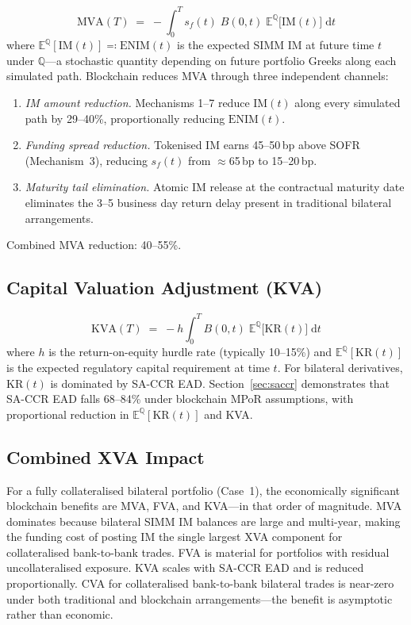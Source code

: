 \documentclass[12pt,letterpaper]{article}
\numberwithin{equation}{section}
\theoremstyle{remark}
\newcommand{\EQ}{\mathbb{E}^{\mathbb{Q}}}          %
\newcommand{\Q}{\mathbb{Q}}                         %
\newcommand{\df}{B(0,t)}
\begin{document}
\begin{equation}
  \mathrm{MVA}(T) \;=\;
  -\int_0^T s_f(t)\;\df\;\EQ\!\bigl[\mathrm{IM}(t)\bigr]\;\mathrm{d}t
  \label{eq:mva}
\end{equation}
where $\EQ[\mathrm{IM}(t)] \eqqcolon \mathrm{ENIM}(t)$ is the expected SIMM
IM at future time $t$ under $\Q$---a stochastic quantity depending on
future portfolio Greeks along each simulated path. Blockchain reduces MVA
through three independent channels:
\begin{enumerate}[leftmargin=2.5em,itemsep=3pt,topsep=4pt]
  \item \textit{IM amount reduction.} Mechanisms 1--7 reduce $\mathrm{IM}(t)$
    along every simulated path by 29--40\%, proportionally reducing
    $\mathrm{ENIM}(t)$.
  \item \textit{Funding spread reduction.} Tokenised IM earns 45--50\,bp
    above SOFR (Mechanism~3), reducing $s_f(t)$ from $\approx$65\,bp to
    15--20\,bp.
  \item \textit{Maturity tail elimination.} Atomic IM release at the
    contractual maturity date eliminates the 3--5 business day return
    delay present in traditional bilateral arrangements.
\end{enumerate}
Combined MVA reduction: 40--55\%.

\subsection{Capital Valuation Adjustment (KVA)}

\begin{equation}
  \mathrm{KVA}(T) \;=\;
  -h\int_0^T \df\;\EQ\!\bigl[\mathrm{KR}(t)\bigr]\;\mathrm{d}t
  \label{eq:kva}
\end{equation}
where $h$ is the return-on-equity hurdle rate (typically 10--15\%) and
$\EQ[\mathrm{KR}(t)]$ is the expected regulatory capital requirement at
time $t$. For bilateral derivatives, $\mathrm{KR}(t)$ is dominated by
SA-CCR EAD. Section~\ref{sec:saccr} demonstrates that SA-CCR EAD falls
68--84\% under blockchain MPoR assumptions, with proportional reduction
in $\EQ[\mathrm{KR}(t)]$ and KVA.

\subsection{Combined XVA Impact}

For a fully collateralised bilateral portfolio (Case~1), the economically
significant blockchain benefits are MVA, FVA, and KVA---in that order of
magnitude. MVA dominates because bilateral SIMM IM balances are large and
multi-year, making the funding cost of posting IM the single largest XVA
component for collateralised bank-to-bank trades. FVA is material for
portfolios with residual uncollateralised exposure. KVA scales with
SA-CCR EAD and is reduced proportionally. CVA for collateralised
bank-to-bank bilateral trades is near-zero under both traditional and
blockchain arrangements---the benefit is asymptotic rather than economic.
\end{document}
